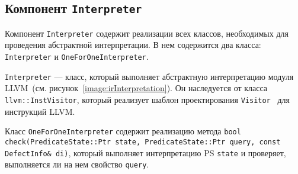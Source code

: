 \subsection{Компонент \texttt{Interpreter}}
Компонент \texttt{Interpreter} содержит реализации всех классов, необходимых для
проведения абстрактной интерпретации. В нем содержится два класса: 
\texttt{Interpreter} и \texttt{OneForOneInterpreter}. 

\texttt{Interpreter} --- класс, который выполняет абстрактную интерпретацию 
модуля LLVM~(см. рисунок~\ref{image:irInterpretation}). Он наследуется от класса
\texttt{llvm::InstVisitor}, который реализует шаблон проектирования 
\texttt{Visitor}~\cite{visitor} для инструкций LLVM.

Класс \texttt{OneForOneInterpreter} содержит реализацию метода
\texttt{bool check(PredicateState::Ptr state, PredicateState::Ptr query, const 
DefectInfo\& di)}, который выполняет интерпретацию PS \texttt{state} и 
проверяет, выполняется ли на нем свойство \texttt{query}.

